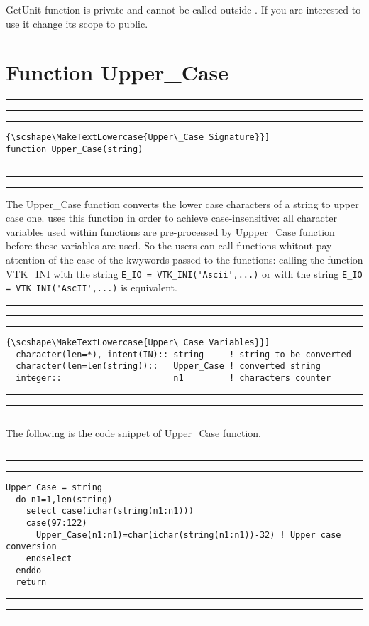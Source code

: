 \documentclass[pagesize=pdftex,fontsize=10pt,paper=a4,oneside]{scrbook}
\newcommand{\code}{\lstinline[style=codeScriptsize]}
\DeclareRobustCommand{\MarginNote}[1]{\marginpar{%
\slshape\footnotesize%
\parindent=0pt\lineskip=0pt\lineskiplimit=0pt%
\tolerance=2000\hyphenpenalty=300\exhyphenpenalty=300%
\doublehyphendemerits=100000\finalhyphendemerits=\doublehyphendemerits%
\raggedright\hspace{0pt}#1}}
\newenvironment{boxred}[1]%
               {%
                \noindent\hspace*{-0.025\textwidth}%
                \color{Maroon}%
                \rule[-5.8pt]{0.6pt}{6pt}\hspace*{-0.6pt}\rule{1.05\textwidth}{0.6pt}\hspace*{-0.6pt}\rule[-5.8pt]{0.6pt}{6pt}%
                \color{black}%
                \vspace*{0.6pt}\MarginNote{\color{Maroon}{#1}}%
               }%
               {%
                \noindent\hspace*{-0.025\textwidth}%
                \color{Maroon}%
                \rule[0pt]{0.6pt}{6pt}\hspace*{-0.6pt}\rule{1.05\textwidth}{0.6pt}\hspace*{-0.6pt}\rule[0pt]{0.6pt}{6pt}%
                \color{black}%
                \vspace*{2mm}%
               }
\DeclareRobustCommand{\MaiuscolettoBS}[1]{\textls[80]{\scshape\MakeTextLowercase{#1}}}
\begin{document}
GetUnit function is private and cannot be called outside \LIBVTKIO. If you are interested to use it change its scope to public.

\section{Function Upper\_Case}
\label{fun:Upper_Case}
 
 
\begin{boxred}{}
\begin{lstlisting}[style=signature,title=\color{Maroon}\MaiuscolettoBS{Upper\_Case Signature}]
function Upper_Case(string)
\end{lstlisting}
\end{boxred}
 
The Upper\_Case function converts the lower case characters of a string to upper case one. \LIBVTKIO uses this function in
order to achieve case-insensitive: all character variables used within \LIBVTKIO functions are pre-processed by
Uppper\_Case function before these variables are used. So the users can call \LIBVTKIO functions whitout pay attention of the
case of the kwywords passed to the functions: calling the function VTK\_INI with the string \code{E_IO = VTK_INI('Ascii',...)}
or with the string  \code{E_IO = VTK_INI('AscII',...)} is equivalent.


 
\begin{boxred}{}
\begin{lstlisting}[style=variables,title=\color{Maroon}\MaiuscolettoBS{Upper\_Case Variables}]
  character(len=*), intent(IN):: string     ! string to be converted
  character(len=len(string))::   Upper_Case ! converted string
  integer::                      n1         ! characters counter

\end{lstlisting}

\end{boxred}
 
The following is the code snippet of Upper\_Case function.

 
\begin{boxred}{Upper\_Case Code Snippet}
\begin{lstlisting}[firstnumber=   277,style=codeFootnotesize]
  Upper_Case = string
  do n1=1,len(string)
    select case(ichar(string(n1:n1)))
    case(97:122)
      Upper_Case(n1:n1)=char(ichar(string(n1:n1))-32) ! Upper case conversion
    endselect
  enddo
  return
\end{lstlisting}

\end{boxred}
 
\end{document}

